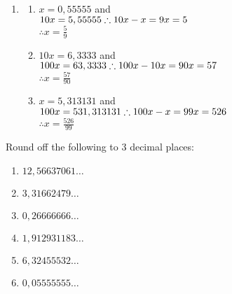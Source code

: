 \begin{solutions}{}
{\begin{enumerate}[itemsep=5pt, label=\textbf{\arabic*}. ]
\begin{multicols}{2}
\begin{enumerate}[itemsep=5pt, label=\textbf{(\alph*)} ]
\end{enumerate}
\end{multicols}
\item %
\begin{multicols}{2}
\begin{enumerate}[itemsep=5pt, label=\textbf{(\alph*)} ] 
 \item \begin{array*}$        
x=0,55555$ and \\$10x = 5,55555 \\
\therefore 10x-x = 9x\\= 5$\\
 $\therefore x=\frac{5}{9}$
\end{array*}

\item  \begin{array*} $10x = 6,3333$ and\\ $100x= 63,3333 \\
        \therefore 100x-10x = 90x \\= 57$\\
 $\therefore x=\frac{57}{90}$
       \end{array*}

\item \begin{array*}
       $x = 5,313131$ and \\$100x=531,313131\\
 \therefore 100x-x=99x=\\526$ \\
$\therefore x=\frac{526}{99}$
      \end{array*}

\end{enumerate}
\end{multicols}
\end{enumerate}
}
\end{solutions}

\begin{exercises}{}
{
Round off the following to $3$ decimal places:
\begin{multicols}{2}
\begin{enumerate}[itemsep=3pt, label=\textbf{\arabic*}. ]
\item $12,56637061\ldots$ %
\item $3,31662479\ldots$ %
\item $0,26666666\ldots$ %
\item $1,912931183\ldots$ %
\item $6,32455532\ldots$ %
\item $0,05555555\ldots$ %
\end{enumerate}
\end{multicols}
}
\end{exercises}

